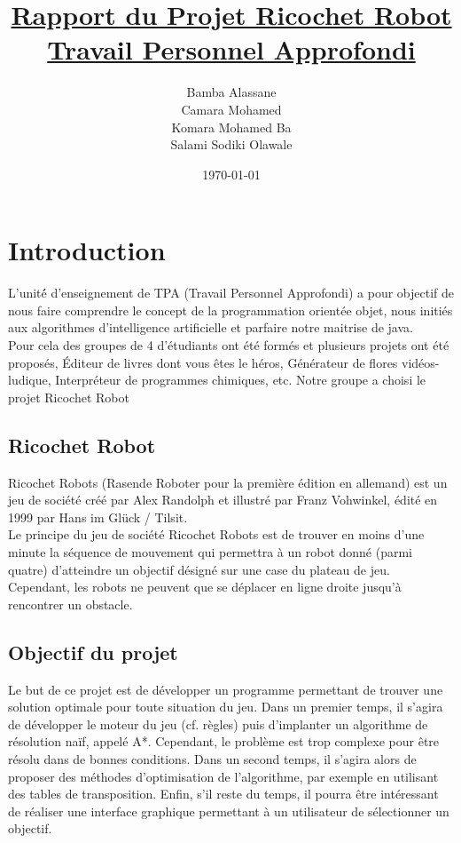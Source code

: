 \documentclass[12pt]{article}
\title{\underline{
		Rapport du Projet Ricochet Robot}
	\underline{
		\\Travail Personnel Approfondi}}
\author{Bamba Alassane
	\\Camara Mohamed
	\\Komara Mohamed Ba
	\\Salami Sodiki Olawale}
\date{\today}
\begin{document}
\maketitle
\newpage
		\tableofcontents
		\newpage
		
		\section{Introduction}


		L’unité́ d’enseignement de TPA (Travail Personnel Approfondi) a pour objectif de nous faire comprendre le concept de la programmation orientée objet, nous initiés aux algorithmes d’intelligence artificielle et parfaire notre maitrise de java. 
		\\Pour cela des groupes de 4 d’étudiants ont été formés et plusieurs projets ont été proposés, Éditeur de livres dont vous êtes le héros, Générateur de flores vidéos-ludique, Interpréteur de programmes chimiques, etc.
		Notre groupe a choisi le projet Ricochet Robot 
		
		
		
			\subsection{Ricochet Robot}
			
			Ricochet Robots (Rasende Roboter pour la première édition en allemand) est un jeu de société créé par Alex Randolph et illustré par Franz Vohwinkel, édité en 1999 par Hans im Glück / Tilsit.
			\\Le principe du jeu de société Ricochet Robots est de trouver en moins d'une minute la séquence de mouvement qui permettra à un robot donné (parmi quatre) d'atteindre un objectif désigné sur une case du plateau de jeu. Cependant, les robots ne peuvent que se déplacer en ligne droite jusqu'à rencontrer un obstacle.
		
			\subsection{Objectif du projet}
			
			Le but de ce projet est de développer un programme permettant de trouver une solution optimale pour toute situation du jeu. Dans un premier temps, il s'agira de développer le moteur du jeu (cf. règles) puis d'implanter un algorithme de résolution naïf, appelé A*. Cependant, le problème est trop complexe pour être résolu dans de bonnes conditions. Dans un second temps, il s'agira alors de proposer des méthodes d'optimisation de l'algorithme, par exemple en utilisant des tables de transposition. Enfin, s'il reste du temps, il pourra être intéressant de réaliser une interface graphique permettant à un utilisateur de sélectionner un objectif. 
			
\end{document}
